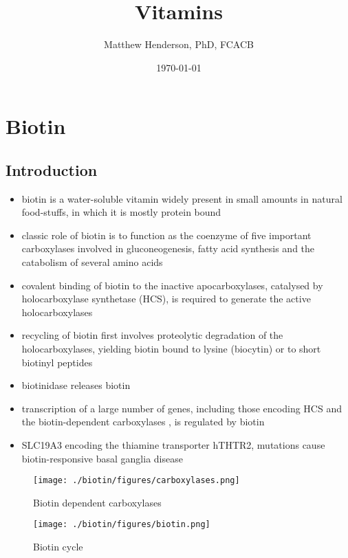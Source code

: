 \documentclass{scrartcl}
\author{Matthew Henderson, PhD, FCACB}
\date{\today}
\title{Vitamins}
\begin{document}
\maketitle
\setcounter{tocdepth}{2}
\tableofcontents


\section{Biotin}
\label{sec:org78e036e}
\subsection{Introduction}
\label{sec:orgb7e8a06}
\begin{itemize}
\item biotin is a water-soluble vitamin widely present in small amounts in
natural food-stuffs, in which it is mostly protein bound
\item classic role of biotin is to function as the coenzyme of five
important carboxylases involved in gluconeogenesis, fatty acid
synthesis and the catabolism of several amino acids
\item covalent binding of biotin to the inactive apocarboxylases,
catalysed by holocarboxylase synthetase (HCS), is required to
generate the active holocarboxylases
\item recycling of biotin first involves proteolytic degradation of the
holocarboxylases, yielding biotin bound to lysine (biocytin) or to
short biotinyl peptides
\item biotinidase releases biotin
\item transcription of a large number of genes, including those encoding
HCS and the biotin-dependent carboxylases , is regulated by biotin
\item SLC19A3 encoding the thiamine transporter hTHTR2, mutations cause
biotin-responsive basal ganglia disease
\end{itemize}

\begin{figure}[htbp]
\centering
\texttt{[image: ./biotin/figures/carboxylases.png]}
\caption{\label{fig:org90170dc}
Biotin dependent carboxylases}
\end{figure}


\begin{figure}[htbp]
\centering
\texttt{[image: ./biotin/figures/biotin.png]}
\caption{\label{fig:org1758e71}
Biotin cycle}
\end{figure}
\end{document}
